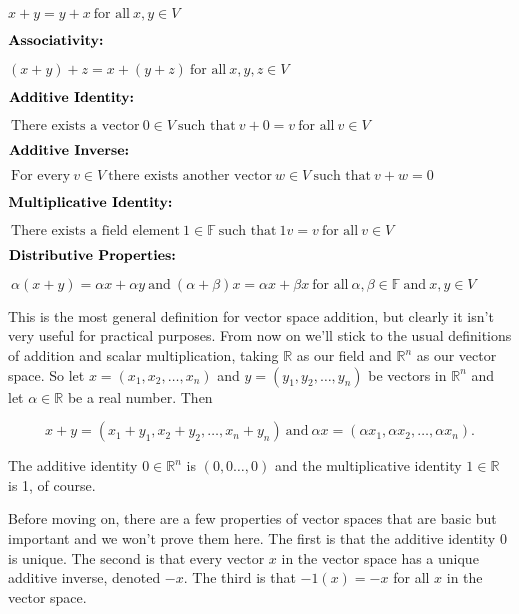\documentclass[12pt]{article}
\begin{document}
$ x + y = y + x \: \textrm{for all} \: x, y \in V$

\vskip 2mm

$\textbf{\textrm{Associativity:}}$ 

$ (x + y) + z = x + (y + z) \: \textrm{for all} \: x, y, z \in V$

\vskip 2mm

$\textbf{\textrm{Additive Identity:}} $

$\: \textrm{There exists a vector} \: 0 \in V \: \textrm{such that} \: v + 0 = v \: \textrm{for all} \: v \in V$

\vskip 2mm

$\textbf{\textrm{Additive Inverse:}} $

$\: \textrm{For every} \: v \in V \: \textrm{there exists another vector} \: w \in V \: \textrm{such that} \: v + w = 0$

\vskip 2mm

$\textbf{\textrm{Multiplicative Identity:}} $

$\: \textrm{There exists a field element} \: 1 \in \mathbb{F} \: \textrm{such that} \: 1v = v \: \textrm{for all} \: v \in V$

\vskip 2mm

$\textbf{\textrm{Distributive Properties:}} $

$\: \alpha(x + y) = \alpha x + \alpha y \: \textrm{and} \: (\alpha + \beta)x = \alpha x + \beta x \: \textrm{for all} \: \alpha, \beta \in \mathbb{F} \: \textrm{and} \: x, y \in V$


\vskip 5mm
This is the most general definition for vector space addition, but clearly it isn't very useful for practical purposes. From now on we'll stick to the usual definitions of addition and scalar multiplication, taking $\mathbb{R}$ as our field and $\mathbb{R}^n$ as our vector space. So let $x = (x_1, x_2, \ldots, x_n)$ and $y = (y_1, y_2, \ldots, y_n)$ be vectors in $\mathbb{R}^n$ and let $\alpha \in \mathbb{R}$ be a real number. Then

$$x + y = (x_1 + y_1, x_2 + y_2, \ldots, x_n + y_n) \: \textrm{and} \: \alpha x = (\alpha x_1, \alpha x_2, \ldots, \alpha x_n).$$

The additive identity $0 \in \mathbb{R}^n$ is $(0, 0 \ldots, 0)$ and the multiplicative identity $1 \in \mathbb{R}$ is 1, of course. 

Before moving on, there are a few properties of vector spaces that are basic but important and we won't prove them here. The first is that the additive identity $0$ is unique. The second is that every vector $x$ in the vector space has a unique additive inverse, denoted $-x$. The third is that $-1(x) = -x$ for all $x$ in the vector space.
\end{document}
